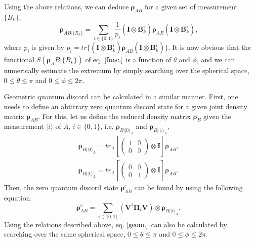 \documentclass[%
 reprint,
 amsmath,amssymb,
 aps,
]{revtex4-1}
\begin{document}
Using the above relations, we can deduce $\boldsymbol{\rho}_{AB}$ for a given set of measurement $\{B_k\}$,
\begin{equation}
\boldsymbol{\rho}_{AB|\{B_k\}} = \sum_{i \in \{0, 1\}} \frac{1}{p_i} (\textbf{I} \otimes \boldsymbol{B}_k^i) \boldsymbol{\rho}_{AB} (\textbf{I} \otimes \boldsymbol{B}_k^i) \text{,}
\end{equation}
\noindent where $p_i$ is given by $p_i = tr \{ (\textbf{I} \otimes \boldsymbol{B}_k^i) \boldsymbol{\rho}_{AB} (\textbf{I} \otimes \boldsymbol{B}_k^i) \}$. It is now obvious that the functional $\textit{S}(\boldsymbol{\rho}_AB|\{B_k\})$ of eq. $\ref{func.}$ is a function of $\theta$ and $\phi$, and we can numerically estimate the extremum by simply searching over the spherical space, $0 \le \theta \le \pi$ and $0 \le \phi \le 2\pi$.

Geometric quantum discord can be calculated in a similar manner. First, one needs to define an abtitrary zero quantum discord state for a given joint density matrix $\boldsymbol{\rho}_{AB}$. For this, let us define the reduced density matrix $\boldsymbol{\rho}_B$ given the measurement $|i\rangle$ of $A$, $i \in \{0, 1\}$, i.e. $\boldsymbol{\rho}_{B||0\rangle_A}$ and $\boldsymbol{\rho}_{B||1\rangle_A}$,
\begin{eqnarray}
\boldsymbol{\rho}_{B||0\rangle_A} = 
tr_A \left[ \left( \begin{array}{cc}
1 & 0 \\
0 & 0 \end{array} \right) \otimes
\boldsymbol{I} \right] \boldsymbol{\rho}_{AB} \text{,} \\
\boldsymbol{\rho}_{B||1\rangle_A} = 
tr_A \left[ \left( \begin{array}{cc}
0 & 0 \\
0 & 1 \end{array} \right) \otimes
\boldsymbol{I} \right] \boldsymbol{\rho}_{AB} \text{.}
\end{eqnarray}
\noindent Then, the zero quantum discord state $\boldsymbol{\rho}_{AB}^{c}$ can be found by using the following equation:
\begin{equation}
\boldsymbol{\rho}_{AB}^{c} = \sum_{i \in \{0,1\}} \left( \textbf{V}^{\dagger} \boldsymbol{\Pi}_i \textbf{V} \right) \otimes \boldsymbol{\rho}_{B||i\rangle_A} \text{.}
\end{equation}
\noindent Using the relations described above, eq. $\ref{geom.}$ can also be calculated by searching over the same spherical space, $0 \le \theta \le \pi$ and $0 \le \phi \le 2\pi$.
\end{document}
